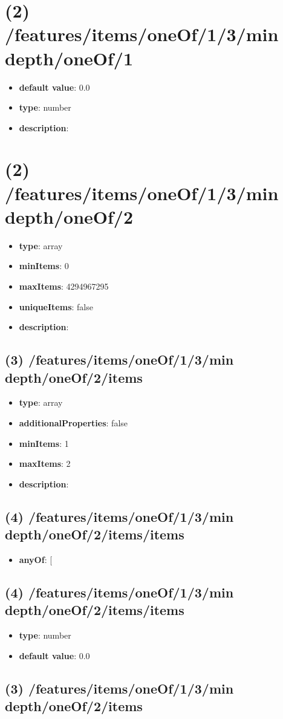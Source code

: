 \section{(2) /features/items/oneOf/1/3/min depth/oneOf/1}
\begin{itemize}[leftmargin=2em]\item {\bf default value}: 0.0
\item {\bf type}: number
\item {\bf description}: 
\end{itemize}\section{(2) /features/items/oneOf/1/3/min depth/oneOf/2}
\begin{itemize}[leftmargin=2em]\item {\bf type}: array
\item {\bf minItems}: 0
\item {\bf maxItems}: 4294967295
\item {\bf uniqueItems}: false
\item {\bf description}: 
\end{itemize}\subsection{(3) /features/items/oneOf/1/3/min depth/oneOf/2/items}
\begin{itemize}[leftmargin=3em]\item {\bf type}: array
\item {\bf additionalProperties}: false
\item {\bf minItems}: 1
\item {\bf maxItems}: 2
\item {\bf description}: 
\end{itemize}\subsection{(4) /features/items/oneOf/1/3/min depth/oneOf/2/items/items}
\begin{itemize}[leftmargin=4em]\item {\bf anyOf}: [\end{itemize}\subsection{(4) /features/items/oneOf/1/3/min depth/oneOf/2/items/items}
\begin{itemize}[leftmargin=4em]\item {\bf type}: number\item {\bf default value}: 0.0
\end{itemize}\subsection{(3) /features/items/oneOf/1/3/min depth/oneOf/2/items}
